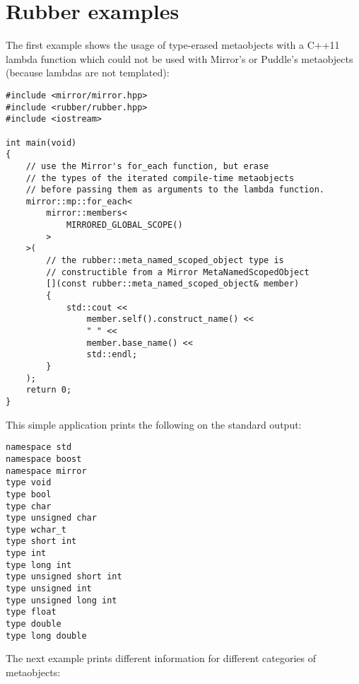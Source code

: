 \section{Rubber examples}
\label{appendix-rubber-examples}

The first example shows the usage of type-erased metaobjects with a C++11
lambda function which could not be used with Mirror's or Puddle's metaobjects
(because lambdas are not templated):

\begin{verbatim}
#include <mirror/mirror.hpp>
#include <rubber/rubber.hpp>
#include <iostream>

int main(void)
{
    // use the Mirror's for_each function, but erase
    // the types of the iterated compile-time metaobjects
    // before passing them as arguments to the lambda function.
    mirror::mp::for_each<
        mirror::members<
            MIRRORED_GLOBAL_SCOPE()
        >
    >(
        // the rubber::meta_named_scoped_object type is
        // constructible from a Mirror MetaNamedScopedObject
        [](const rubber::meta_named_scoped_object& member)
        {
            std::cout <<
                member.self().construct_name() <<
                " " <<
                member.base_name() <<
                std::endl;
        }
    );
    return 0;
}
\end{verbatim}

This simple application prints the following on the standard output:

\begin{verbatim}
namespace std
namespace boost
namespace mirror
type void
type bool
type char
type unsigned char
type wchar_t
type short int
type int
type long int
type unsigned short int
type unsigned int
type unsigned long int
type float
type double
type long double
\end{verbatim}

The next example prints different information for different categories
of metaobjects:

